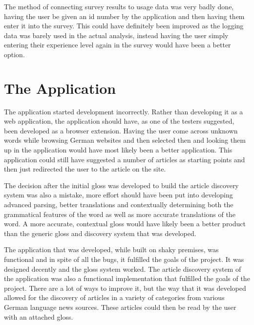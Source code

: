 The method of connecting survey results to usage data was very badly done, having the user be given an id number by the application and then having them enter it into the survey. This could have definitely been improved as the logging data was barely used in the actual analysis, instead having the user simply entering their experience level again in the survey would have been a better option. 

\section{The Application}

The application started development incorrectly. Rather than developing it as a web application, the application should have, as one of the testers suggested, been developed as a browser extension. Having the user come across unknown  words while browsing German websites and then selected then and looking them up in the application would have most likely been a better application. This application could still have suggested a number of articles as starting points and then just redirected the user to the article on the site. 

The decision after the initial gloss was developed to build the article discovery system was also a mistake, more effort should have been put into developing advanced parsing, better translations and contextually determining both the grammatical features of the word as well as more accurate translations of the word. A more accurate, contextual gloss would have likely been a better product than the generic gloss and discovery system that was developed.

The application that was developed, while built on shaky premises, was functional and in spite of all the bugs, it fulfilled the goals of the project. It was designed decently and the gloss system worked. The article discovery system of the application was also a functional implementation that fulfilled the goals of the project. There are a lot of ways to improve it, but the way that it was developed allowed for the discovery of articles in a variety of categories from various German language news sources. These articles could then be read by the user with an attached gloss.

